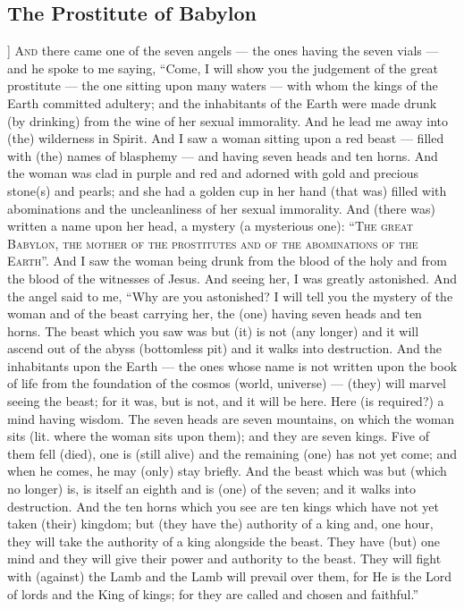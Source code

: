 \begin{pages}
\begin{Leftside}
        			\chapter{The Prostitute of Babylon}
				]		
		\renewcommand{\LettrineFontHook}{\Zallmanfamily}
		\lettrine[lines=3]{A}{nd} there came one of the seven angels — the ones having the seven vials — and he spoke to me saying, “Come, I will show you the judgement of the great prostitute — the one sitting upon many waters — with whom the kings of the Earth committed adultery; and the inhabitants of the Earth were made drunk (by drinking) from the wine of her sexual immorality. 
		\pend
		\pstart
		And he lead me away into (the) wilderness in Spirit. And I saw a woman sitting upon a red beast — filled with (the) names of blasphemy — and having seven heads and ten horns. And the woman was clad in purple and red and adorned with gold and precious stone(s) and pearls; and she had a golden cup in her hand (that was) filled with abominations and the uncleanliness of her sexual immorality. And (there was) written a name upon her head, a mystery (a mysterious one): “\textsc{The great Babylon, the mother of the prostitutes and of the abominations of the Earth}”.
		\pend
		\pstart
		And I saw the woman being drunk from the blood of the holy and from the blood of the witnesses of Jesus. And seeing her, I was greatly astonished. And the angel said to me, “Why are you astonished? I will tell you the mystery of the woman and of the beast carrying her, the (one) having seven heads and ten horns. The beast which you saw was but (it) is not (any longer) and it will ascend out of the abyss (bottomless pit) and it walks into destruction. And the inhabitants upon the Earth — the ones whose name is not written upon the book of life from the foundation of the cosmos (world, universe) — (they) will marvel seeing the beast; for it was, but is not, and it will be here.
		\pend
		\pstart	
		Here (is required?) a mind having wisdom. The seven heads are seven mountains, on which the woman sits (lit. where the woman sits upon them); and they are seven kings. Five of them fell (died), one is (still alive) and the remaining (one) has not yet come; and when he comes, he may (only) stay briefly.
		\pend
		\pstart
		And the beast which was but (which no longer) is, is itself an eighth and is (one) of the seven; and it walks into destruction. And the ten horns which you see are ten kings which have not yet taken (their) kingdom; but (they have the) authority of a king and, one hour, they will take the authority of a king alongside the beast. They have (but) one mind and they will give their power and authority to the beast. They will fight with (against) the Lamb and the Lamb will prevail over them, for He is the Lord of lords and the King of kings; for they are called and chosen and faithful.”

\end{Leftside}
\end{pages}
